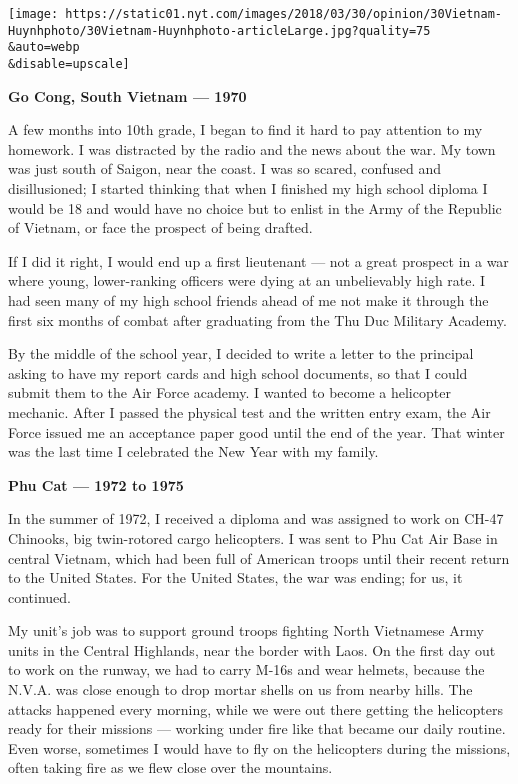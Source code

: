 \texttt{[image: https://static01.nyt.com/images/2018/03/30/opinion/30Vietnam-Huynhphoto/30Vietnam-Huynhphoto-articleLarge.jpg?quality=75\\\&auto=webp\\\&disable=upscale]}

\textbf{Go Cong, South Vietnam --- 1970}

A few months into 10th grade, I began to find it hard to pay attention
to my homework. I was distracted by the radio and the news about the
war. My town was just south of Saigon, near the coast. I was so scared,
confused and disillusioned; I started thinking that when I finished my
high school diploma I would be 18 and would have no choice but to enlist
in the Army of the Republic of Vietnam, or face the prospect of being
drafted.

If I did it right, I would end up a first lieutenant --- not a great
prospect in a war where young, lower-ranking officers were dying at an
unbelievably high rate. I had seen many of my high school friends ahead
of me not make it through the first six months of combat after
graduating from the Thu Duc Military Academy.

By the middle of the school year, I decided to write a letter to the
principal asking to have my report cards and high school documents, so
that I could submit them to the Air Force academy. I wanted to become a
helicopter mechanic. After I passed the physical test and the written
entry exam, the Air Force issued me an acceptance paper good until the
end of the year. That winter was the last time I celebrated the New Year
with my family.

\textbf{Phu Cat --- 1972 to 1975}

In the summer of 1972, I received a diploma and was assigned to work on
CH-47 Chinooks, big twin-rotored cargo helicopters. I was sent to Phu
Cat Air Base in central Vietnam, which had been full of American troops
until their recent return to the United States. For the United States,
the war was ending; for us, it continued.

My unit's job was to support ground troops fighting North Vietnamese
Army units in the Central Highlands, near the border with Laos. On the
first day out to work on the runway, we had to carry M-16s and wear
helmets, because the N.V.A. was close enough to drop mortar shells on us
from nearby hills. The attacks happened every morning, while we were out
there getting the helicopters ready for their missions --- working under
fire like that became our daily routine. Even worse, sometimes I would
have to fly on the helicopters during the missions, often taking fire as
we flew close over the mountains.

